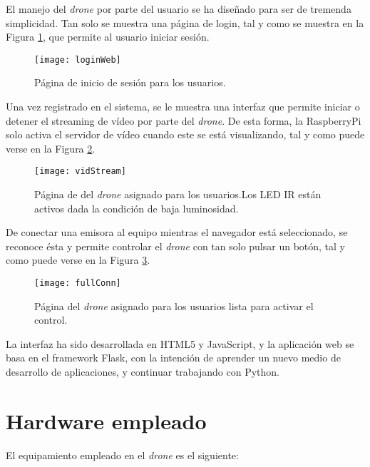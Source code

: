 El manejo del \emph{drone} por parte del usuario se ha diseñado para ser de tremenda simplicidad. 
Tan solo se muestra una página de login, tal y como se muestra en la Figura \ref{fig:login}, que permite al usuario iniciar sesión. 

\begin{figure}[H]
	\centering
	\texttt{[image: loginWeb]}
	\caption[Página de Login]{Página de inicio de sesión para los usuarios.}\label{fig:login}
\end{figure}

Una vez registrado en el sistema, se le muestra una interfaz que permite iniciar o detener el streaming de vídeo por parte del \emph{drone}. De esta forma, la RaspberryPi solo activa el servidor de vídeo cuando este se está visualizando, tal y como puede verse en la Figura \ref{fig:vidStream}. 
\begin{figure}[H]
	\centering
	\texttt{[image: vidStream]}
	\caption[Página de control]{Página de del \emph{drone} asignado para los usuarios.Los LED IR están activos dada la condición de baja luminosidad.}\label{fig:vidStream}
\end{figure}

De conectar una emisora al equipo mientras el navegador está seleccionado, se reconoce ésta y permite controlar el \emph{drone} con tan solo pulsar un botón, tal y como puede verse en la Figura \ref{fig:fullConn}.

\begin{figure}[H]
	\centering
	\texttt{[image: fullConn]}
	\caption[Página de control y emisora]{Página del \emph{drone} asignado para los usuarios lista para activar el control.}\label{fig:fullConn}
\end{figure}

La interfaz ha sido desarrollada en HTML5 y JavaScript, y la aplicación web se basa en el framework Flask, con la intención de aprender un nuevo medio de desarrollo de aplicaciones, y continuar trabajando con Python. 



\section{Hardware empleado}

El equipamiento empleado en el \emph{drone} es el siguiente: 

